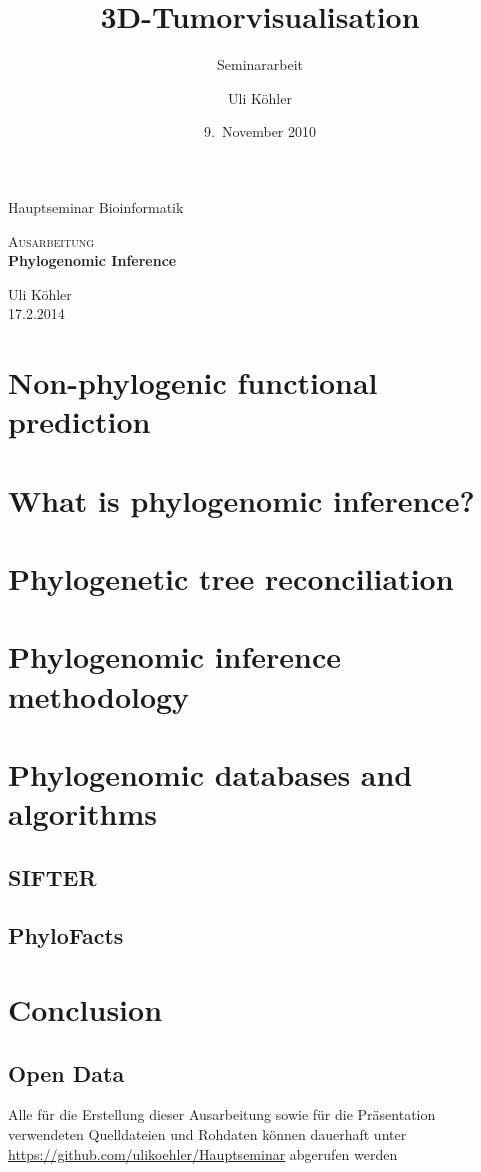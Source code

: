 \documentclass[ngerman,pdftex,paper=A4,DIV=calc,titlepage,12pt]{scrartcl}
\title{3D-Tumorvisualisation}
\subtitle{Seminararbeit}
\author{Uli Köhler}
\date{9.~November 2010}
\newtheorem[L]{boxedDefinition}{Definition}
\begin{document}
\begin{titlepage}
\begin{center}
 Hauptseminar Bioinformatik
 \end{center}
\vspace{2cm}
\begin{center}
 \large\textsc{Ausarbeitung}\\[5mm]
 {\Huge\centering\bfseries\selectfont Phylogenomic Inference}\\[2cm]
\begin{center}
  Uli Köhler\\
  17.2.2014
\end{center}
\vspace{2cm}
\end{center}
\tableofcontents
\end{titlepage}

\section{Non-phylogenic functional prediction}

\section{What is phylogenomic inference?}
\section{Phylogenetic tree reconciliation}
\section{Phylogenomic inference methodology}
\section{Phylogenomic databases and algorithms}
\subsection{SIFTER}
\subsection{PhyloFacts}
\section{Conclusion}

\renewcommand\refname{Literatur- und Quellenverzeichnis}


\subsection*{Open Data}\label{opendata}
Alle für die Erstellung dieser Ausarbeitung sowie für die Präsentation verwendeten Quelldateien und Rohdaten können dauerhaft unter \url{https://github.com/ulikoehler/Hauptseminar} abgerufen werden
\end{document}

